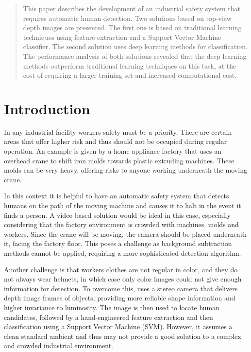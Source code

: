 \begin{abstract}
This paper describes the development of an industrial safety system that requires automatic human detection. Two solutions based on top-view depth images are presented. The first one is based on traditional learning techniques using feature extraction and a Support Vector Machine classifier. The second solution uses deep learning methods for classification. The performance analysis of both solutions revealed that the deep learning methods outperform traditional learning techniques on this task, at the cost of requiring a larger training set and increased computational cost.
\end{abstract}

\section{Introduction}
  In any industrial facility workers safety must be a priority. There are certain areas that offer higher risk and thus should not be occupied during regular operation. An example is given by a home appliance factory that uses an overhead crane to shift iron molds towards plastic extruding machines. These molds can be very heavy, offering risks to anyone working underneath the moving crane.

  In this context it is helpful to have an automatic safety system that detects humans on the path of the moving machine and causes it to halt in the event it finds a person. A video based solution would be ideal in this case, especially considering that the factory environment is crowded with machines, molds and workers. Since the crane will be moving, the camera should be placed underneath it,  facing the factory floor. This poses a challenge as background subtraction methods cannot be applied, requiring a more sophisticated detection algorithm.

  Another challenge is that workers clothes are not regular in color, and they do not always wear helmets, in which case only color images could not give enough information for detection. To overcome this, \cite{rauter} uses a stereo camera that delivers depth image frames of objects, providing more reliable shape information and higher invariance to luminosity. The image is then used to locate human candidates, followed by a hand-engineered feature extraction and then classification using a Support Vector Machine (SVM). However, it assumes a clean standard ambient and thus may not provide a good solution to a complex and crowded industrial environment.

